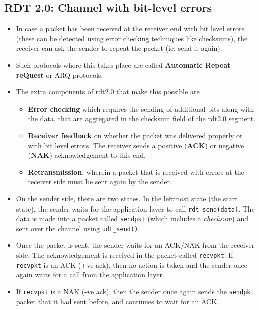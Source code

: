 \documentclass{article}
\theoremstyle{plain}
\theoremstyle{definition}
\begin{document}
\subsection{RDT 2.0: Channel with bit-level errors}
\begin{itemize}
    \item In case a packet has been received at the receiver end with bit level errors (these can be detected using error checking techniques like checksums), the receiver can ask the sender to repeat the packet (ie. send it again).
    
    \item Such protocols where this takes place are called \textbf{Automatic Repeat reQuest} or ARQ protocols. 
    
    \item The extra components of rdt2.0 that make this possible are
    \begin{itemize}
        \item \textbf{Error checking} which requires the sending of additional bits along with the data, that are aggregated in the checksum field of the rdt2.0 segment. 
        
        \item \textbf{Receiver feedback} on whether the packet was delivered properly or with bit level errors. The receiver sends a positive (\textbf{ACK}) or negative (\textbf{NAK}) acknowledgement to this end. 
        
        \item \textbf{Retransmission}, wherein a packet that is received with errors at the receiver side must be sent again by the sender. 
    \end{itemize}
    \item On the sender side, there are two states. In the leftmost state (the start state), the sender waits for the application layer to call \texttt{rdt\_send(data)}. The data is made into a packet called \texttt{sendpkt} (which includes a \textit{checksum}) and sent over the channel using \texttt{udt\_send()}.
    
    \item Once the packet is sent, the sender waits for an ACK/NAK from the receiver side. The acknowledgement is received in the packet called \texttt{recvpkt}. If \texttt{recvpkt} is an ACK (+ve ack), then no action is taken and the sender once again waits for a call from the application layer. 
    
    \item If \texttt{recvpkt} is a NAK (-ve ack), then the sender once again sends the \texttt{sendpkt} packet that it had sent before, and continues to wait for an ACK.
    

\end{itemize}
\end{document}
